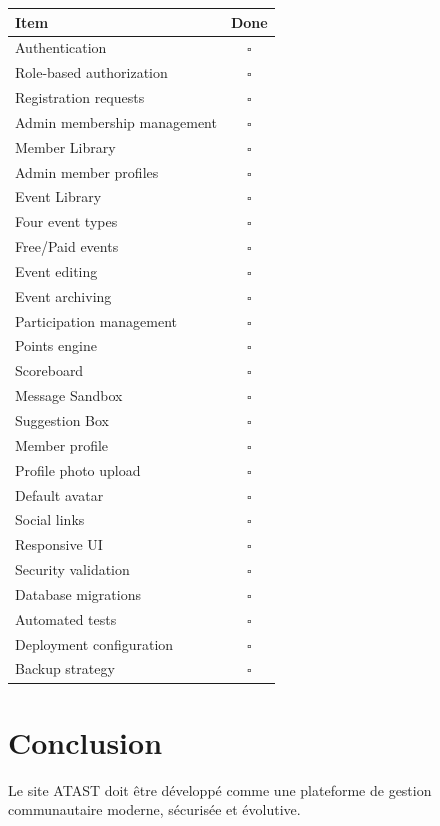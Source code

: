 \documentclass[11pt,a4paper]{report}
\begin{document}
\begin{longtable}{p{}c}
\toprule
\textbf{Item} & \textbf{Done}\\
\midrule
Authentication & $\square$\\
Role-based authorization & $\square$\\
Registration requests & $\square$\\
Admin membership management & $\square$\\
Member Library & $\square$\\
Admin member profiles & $\square$\\
Event Library & $\square$\\
Four event types & $\square$\\
Free/Paid events & $\square$\\
Event editing & $\square$\\
Event archiving & $\square$\\
Participation management & $\square$\\
Points engine & $\square$\\
Scoreboard & $\square$\\
Message Sandbox & $\square$\\
Suggestion Box & $\square$\\
Member profile & $\square$\\
Profile photo upload & $\square$\\
Default avatar & $\square$\\
Social links & $\square$\\
Responsive UI & $\square$\\
Security validation & $\square$\\
Database migrations & $\square$\\
Automated tests & $\square$\\
Deployment configuration & $\square$\\
Backup strategy & $\square$\\
\bottomrule
\end{longtable}

\chapter{Conclusion}

Le site ATAST doit être développé comme une plateforme de gestion communautaire moderne, sécurisée et évolutive.
\end{document}
